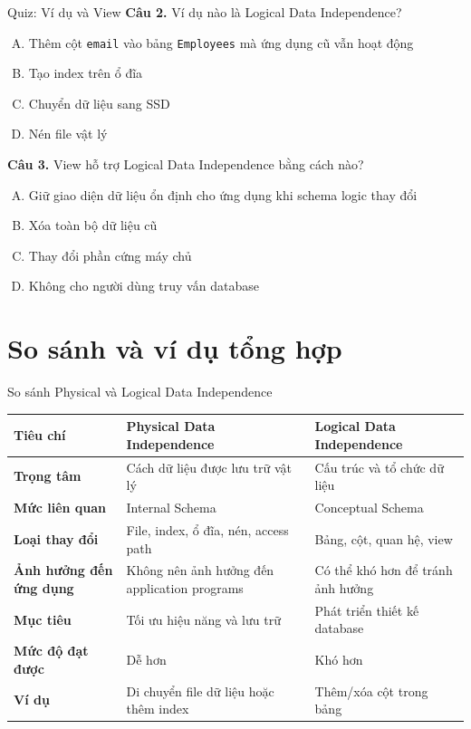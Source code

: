 \documentclass[aspectratio=169,11pt]{beamer}
\begin{document}
\begin{frame}{Quiz: Ví dụ và View}
\textbf{Câu 2.} Ví dụ nào là Logical Data Independence?
\begin{enumerate}[A.]
  \item Thêm cột \texttt{email} vào bảng \texttt{Employees} mà ứng dụng cũ vẫn hoạt động
  \item Tạo index trên ổ đĩa
  \item Chuyển dữ liệu sang SSD
  \item Nén file vật lý
\end{enumerate}

\vspace{0.2cm}
\textbf{Câu 3.} View hỗ trợ Logical Data Independence bằng cách nào?
\begin{enumerate}[A.]
  \item Giữ giao diện dữ liệu ổn định cho ứng dụng khi schema logic thay đổi
  \item Xóa toàn bộ dữ liệu cũ
  \item Thay đổi phần cứng máy chủ
  \item Không cho người dùng truy vấn database
\end{enumerate}
\end{frame}

\section{So sánh và ví dụ tổng hợp}

\begin{frame}{So sánh Physical và Logical Data Independence}
\scriptsize
\begin{tabularx}{\textwidth}{>{\bfseries}p{}XX}
\toprule
Tiêu chí & Physical Data Independence & Logical Data Independence \\
\midrule
Trọng tâm & Cách dữ liệu được lưu trữ vật lý & Cấu trúc và tổ chức dữ liệu \\
Mức liên quan & Internal Schema & Conceptual Schema \\
Loại thay đổi & File, index, ổ đĩa, nén, access path & Bảng, cột, quan hệ, view \\
Ảnh hưởng đến ứng dụng & Không nên ảnh hưởng đến application programs & Có thể khó hơn để tránh ảnh hưởng \\
Mục tiêu & Tối ưu hiệu năng và lưu trữ & Phát triển thiết kế database \\
Mức độ đạt được & Dễ hơn & Khó hơn \\
Ví dụ & Di chuyển file dữ liệu hoặc thêm index & Thêm/xóa cột trong bảng \\
\bottomrule
\end{tabularx}
\end{frame}
\end{document}
